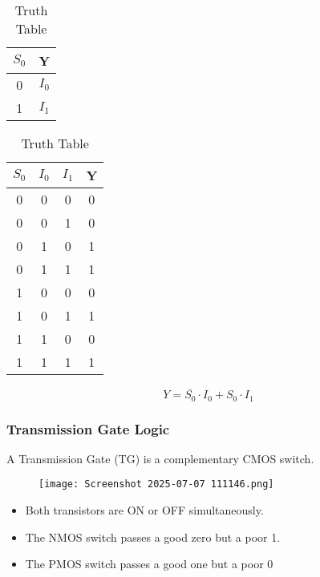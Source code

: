 \documentclass[12pt]{article}
\begin{document}
\begin{table}[H]
\centering
\begin{minipage}{0.4\textwidth}
\centering
\caption{Truth Table}
\begin{tabular}{|c|c|}
\hline
$S_0$ & Y \\
\hline
0 & $I_0$ \\
1 & $I_1$ \\
\hline
\end{tabular}
\end{minipage}
\hfill
\begin{minipage}{0.5\textwidth}
\centering
\caption{Truth Table}
\begin{tabular}{|c|c|c|c|}
\hline
$S_0$ & $I_0$ & $I_1$ & Y \\
\hline
0 & 0 & 0 & 0 \\
0 & 0 & 1 & 0 \\
0 & 1 & 0 & 1 \\
0 & 1 & 1 & 1 \\
1 & 0 & 0 & 0 \\
1 & 0 & 1 & 1 \\
1 & 1 & 0 & 0 \\
1 & 1 & 1 & 1 \\
\hline
\end{tabular}
\end{minipage}
\end{table}


\[
Y = \overline{S_0} \cdot I_0 + S_0 \cdot I_1
\]

        
        
    \subsubsection{\textbf{Transmission Gate Logic} }

        A Transmission Gate (TG) is a complementary CMOS switch.
        \begin{figure}[H]
            \centering
            \texttt{[image: Screenshot 2025-07-07 111146.png]}
            \label{fig:enter-label}
        \end{figure}

        \begin{itemize}
            \item Both transistors are ON or OFF simultaneously.
            \item The NMOS switch passes a good zero but a poor 1.
            \item The PMOS switch passes a good one but a poor 0
        \end{itemize}
\end{document}
